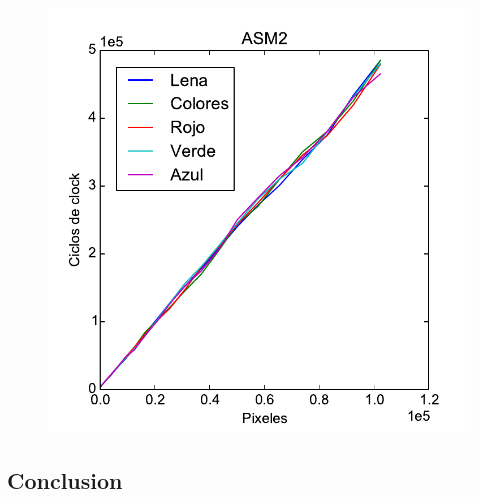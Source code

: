 \begin{figure}[h!]
	\includegraphics[scale=0.45]{images/asm2_merge_lena_colors}
\end{figure}

\subsection{Conclusion}
